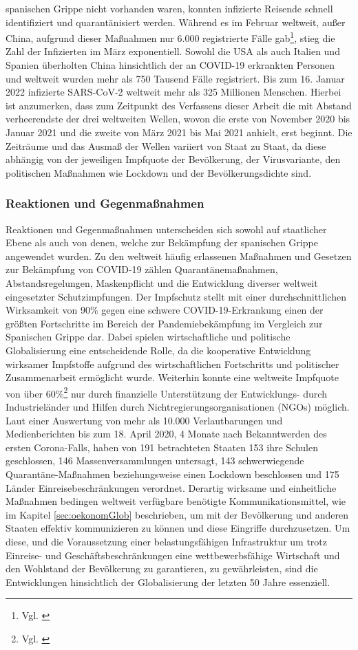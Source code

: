 \documentclass[12pt]{article}
\begin{document}
spanischen Grippe nicht vorhanden waren, konnten infizierte Reisende schnell identifiziert und quarantänisiert werden. Während es im Februar weltweit, außer China, aufgrund dieser Maßnahmen nur 6.000 registrierte Fälle gab\footnote{Vgl. \cite{Feb2020}}, stieg die Zahl der Infizierten im März exponentiell. Sowohl die USA als auch Italien und Spanien überholten China hinsichtlich der an COVID-19 erkrankten Personen und weltweit wurden mehr als 750 Tausend Fälle registriert. Bis zum 16. Januar 2022 infizierte SARS-CoV-2 weltweit mehr als 325 Millionen Menschen. Hierbei ist anzumerken, dass zum Zeitpunkt des Verfassens dieser Arbeit die mit Abstand verheerendste der drei weltweiten Wellen, wovon die erste von November 2020 bis Januar 2021 und die zweite von März 2021 bis Mai 2021 anhielt, erst beginnt. Die Zeiträume und das Ausmaß der Wellen variiert von Staat zu Staat, da diese abhängig von der jeweiligen Impfquote der Bevölkerung, der Virusvariante, den politischen Maßnahmen wie Lockdown und der Bevölkerungsdichte sind.

\subsubsection{Reaktionen und Gegenmaßnahmen}
Reaktionen und Gegenmaßnahmen unterscheiden sich sowohl auf staatlicher Ebene als auch von denen, welche zur Bekämpfung der spanischen Grippe angewendet wurden. Zu den weltweit häufig erlassenen Maßnahmen und Gesetzen zur Bekämpfung von COVID-19 zählen Quarantänemaßnahmen, Abstandsregelungen, Maskenpflicht und die Entwicklung diverser weltweit eingesetzter Schutzimpfungen. Der Impfschutz stellt mit einer durchschnittlichen Wirksamkeit von 90\% gegen eine schwere COVID-19-Erkrankung einen der größten Fortschritte im Bereich der Pandemiebekämpfung im Vergleich zur Spanischen Grippe dar. Dabei spielen wirtschaftliche und politische Globalisierung eine entscheidende Rolle, da die kooperative Entwicklung wirksamer Impfstoffe aufgrund des wirtschaftlichen Fortschritts und politischer Zusammenarbeit ermöglicht wurde. Weiterhin konnte eine weltweite Impfquote von über 60\%\footnote{Vgl. \cite{NYT22}} nur durch finanzielle Unterstützung der Entwicklungs- durch Industrieländer und Hilfen durch Nichtregierungsorganisationen (NGOs) möglich. Laut einer Auswertung von mehr als 10.000 Verlautbarungen und Medienberichten bis zum 18. April 2020, 4 Monate nach Bekanntwerden des ersten Corona-Falls, haben von 191 betrachteten Staaten 153 ihre Schulen geschlossen, 146 Massenversammlungen untersagt, 143 schwerwiegende Quarantäne-Maßnahmen beziehungsweise einen Lockdown beschlossen und 175 Länder Einreisebeschränkungen verordnet. Derartig wirksame und einheitliche Maßnahmen bedingen weltweit verfügbare benötigte Kommunikationsmittel, wie im Kapitel \ref{sec:oekonomGlob} beschrieben, um mit der Bevölkerung und anderen Staaten effektiv kommunizieren zu können und diese Eingriffe durchzusetzen. Um diese, und die Voraussetzung einer belastungsfähigen Infrastruktur um trotz Einreise- und Geschäftsbeschränkungen eine wettbewerbsfähige Wirtschaft und den Wohlstand der Bevölkerung zu garantieren, zu gewährleisten, sind die Entwicklungen hinsichtlich der Globalisierung der letzten 50 Jahre essenziell.
\end{document}
